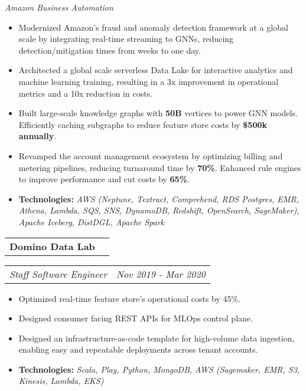 \documentclass[a4paper,11pt]{article}
\makeatletter
\newcommand{\resitem}[1]{\item #1}
\newcommand{\resCompany}[1]{
    \begin{tabular*}{\textwidth}{l @{\extracolsep{\fill}} r}
    \large \textbf{#1}
  \end{tabular*}
}
\newcommand{\resPosition}[2]{
    \begin{tabular*}{\textwidth}{l @{\extracolsep{\fill}} r}
        \textit{#1} & \textit{#2}
    \end{tabular*}
}
\makeatother
\begin{document}
        \indent \textit{Amazon Business Automation}
        \begin{itemize}[leftmargin=30pt, rightmargin=-16pt, itemsep=-2pt]
            \setlength{\itemsep}{-3pt}
            
            \resitem{Modernized Amazon's fraud and anomaly detection framework at a global scale by integrating real-time streaming to GNNs, reducing detection/mitigation times from weeks to one day.}
            
            \resitem{Architected a global scale serverless Data Lake for interactive analytics and machine learning training, resulting in a 3x improvement in operational metrics and a 10x reduction in costs.}
            
            \resitem{Built large-scale knowledge graphs with \textbf{50B} vertices to power GNN models. Efficiently caching subgraphs to reduce feature store costs by \textbf{\$500k annually}.}

            \resitem{Revamped the account management ecosystem by optimizing billing and metering pipelines, reducing turnaround time by \textbf{70\%}. Enhanced rule engines to improve performance and cut costs by \textbf{65\%}.}

            \resitem{\textbf{Technologies:} \textit{AWS (Neptune, Textract, Comprehend, RDS Postgres, EMR, Athena, Lambda, SQS, SNS, DynamoDB, Redshift, OpenSearch, SageMaker), 
            Apache Iceberg, DistDGL, Apache Spark}}
            
        \end{itemize}

\pagebreak
    \indent \resCompany{Domino Data Lab}
        \indent \resPosition{Staff Software Engineer}{Nov 2019 - Mar 2020}
        \begin{itemize}[leftmargin=30pt, rightmargin=-16pt, itemsep=-2pt]
            \setlength{\itemsep}{-3pt}
            
            \resitem{Optimized real-time feature store's operational costs by 45\%.}
            \resitem{Designed consumer facing REST APIs for MLOps control plane.}
            \resitem{Designed an infrastructure-as-code template for high-volume data ingestion, enabling easy and repeatable deployments across tenant accounts.}

            \resitem{\textbf{Technologies:} \textit{Scala, Play, Python, MongoDB, AWS (Sagemaker, EMR, S3, Kinesis, Lambda, EKS)}}
            
        \end{itemize}
\end{document}
